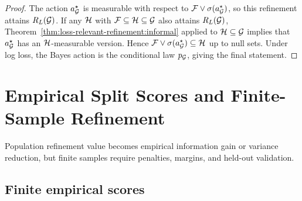 \begin{proof}
The action $a_{\mathcal{G}}^\star$ is measurable with respect to $\mathcal{F}\vee\sigma(a_{\mathcal{G}}^\star)$, so this refinement attains $R_L(\mathcal{G})$. If any $\mathcal{H}$ with $\mathcal{F}\subseteq\mathcal{H}\subseteq\mathcal{G}$ also attains $R_L(\mathcal{G})$, Theorem~\ref{thm:loss-relevant-refinement:informal} applied to $\mathcal{H}\subseteq\mathcal{G}$ implies that $a_{\mathcal{G}}^\star$ has an $\mathcal{H}$-measurable version. Hence $\mathcal{F}\vee\sigma(a_{\mathcal{G}}^\star)\subseteq\mathcal{H}$ up to null sets. Under log loss, the Bayes action is the conditional law $p_{\mathcal{G}}$, giving the final statement.
\end{proof}

\section{Empirical Split Scores and Finite-Sample Refinement}
\label{sec:finite-sample-refinement}

Population refinement value becomes empirical information gain or variance reduction, but finite samples require penalties, margins, and held-out validation.

\subsection{Finite empirical scores}

